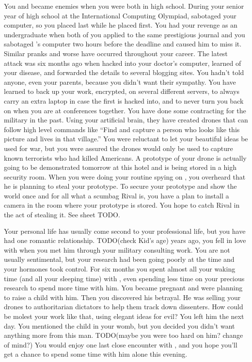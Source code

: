 \documentclass[char]{guildcamp1}
\begin{document}
You and \cRival{} became enemies when you were both in high school.  During your senior year of high school at the International Computing Olympiad, \cRival{} sabotaged your computer, so you placed last while he placed first.  You had your revenge as an undergraduate when both of you applied to the same prestigious journal and you sabotaged \cRival{}'s computer two hours before the deadline and caused him to miss it.  Similar pranks and worse have occurred throughout your career.  The latest attack was six months ago when \cRival{} hacked into your doctor's computer, learned of your disease, and forwarded the details to several blogging sites.  You hadn't told anyone, even your parents, because you didn't want their sympathy.  You have learned to back up your work, encrypted, on several different servers, to always carry an extra laptop in case the first is hacked into, and to never turn you back on \cRival{} when you are at conferences together. 
You have done some contracting for the military in the past.  Using your artificial brain, they have created drones that can follow high level commands like ``Find and capture a person who looks like this picture and lives in that village.''  You were reluctant to let your beautiful ideas be used for war, but you were assured the drones would only be used to capture known terrorists who had killed Americans.  A prototype of your drone is actually going to be demonstrated tomorrow at this hotel and is being stored in a high security room.  When you were doing your routine spying on \cRival{}, you overheard that he is planning to steal your prototype.  To secure your prototype and show the world once and for all what a scumbag Rival is, you have a plan to install a camera in the room where your prototype is stored.  You hope to catch Rival in the act of stealing it. See sheet TODO.

 Your personal life has usually come second to your professional life, but you have had one romantic relationship.  TODO(check Kid's age) years ago, you fell in love with \cGroomA{\intro{}} when you met him through your military consulting work.  You are not usually sentimental, but your research had been going poorly at the time and your hormones took control. For six months you spent almost all your waking time (and all your sleeping time) with \cGroomA{},%
even spending less time on your precious research to spend more time with him.  You became pregnant and were planning to raise a child with him.  Then you discovered his betrayal.  He was selling your drones to authoritarian dictators to help them track down dissenters.  How could be molest your work like that, using elegant ideas for evil?  You left him the next day.  You mentioned the child in your womb, but you decided you didn't want anything more from this man.  TODO(maybe you were too hard on him? change of mind?)
You would enjoy one last close encounter with \cGroomA{}, and you hope you'll get a chance to spend some time with him alone this evening.
\end{document}
